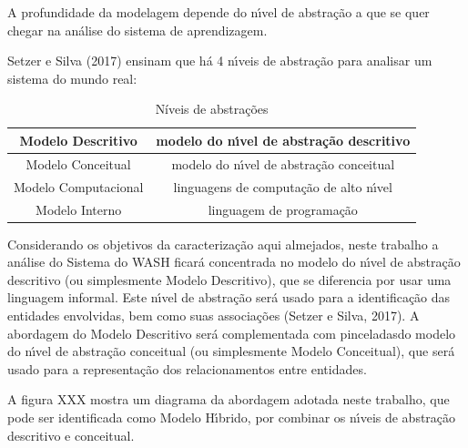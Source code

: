 \documentclass[
12pt,		%
openright,	%
twoside,  %
a4paper,			%
chapter=TITLE,		%
english,			%
french,				%
spanish,			%
brazil				%
]{USPSC-classe/USPSC}
\begin{document}
A profundidade da modelagem depende do n\'{\i}vel de abstra\c{c}\~ao a que se quer chegar na an\'alise do sistema de aprendizagem.










Setzer e Silva (2017) ensinam que h\'a 4 n\'{\i}veis de abstra\c{c}\~ao para analisar um sistema do mundo real:














\begin{table}[htb]
\tiny
\caption{\label{98b39a827ce08562e7aeba26851f8d86d1af7179}N\'{i}veis de abstra\c{c}\~oes}

\centering
\begin{tabular}{|c|c|}
\hline
Modelo Descritivo  &  modelo do n\'{\i}vel de abstra\c{c}\~ao descritivo \\
\hline
Modelo Conceitual  &  modelo do n\'{\i}vel de abstra\c{c}\~ao conceitual \\
\hline
Modelo Computacional  &  linguagens de computa\c{c}\~ao de alto n\'{\i}vel \\
\hline
Modelo Interno  &  linguagem de programa\c{c}\~ao \\
\hline
\end{tabular}
\end{table}


Considerando os objetivos da caracteriza\c{c}\~ao aqui almejados, neste trabalho a an\'alise do Sistema do WASH ficar\'a concentrada no modelo do n\'{\i}vel de abstra\c{c}\~ao descritivo (ou simplesmente Modelo Descritivo), que se diferencia por usar uma linguagem informal. Este n\'{\i}vel de abstra\c{c}\~ao ser\'a usado para a identifica\c{c}\~ao das entidades envolvidas, bem como suas associa\c{c}\~oes  (Setzer e Silva, 2017). A abordagem do Modelo Descritivo ser\'a complementada com \textquotedbl pinceladas\textquotedbl  do modelo do n\'{\i}vel de abstra\c{c}\~ao conceitual (ou simplesmente Modelo Conceitual), que ser\'a usado para a representa\c{c}\~ao dos relacionamentos entre entidades.










A figura XXX mostra um diagrama da abordagem adotada neste trabalho, que pode ser identificada como \textquotedbl Modelo H\'{\i}brido\textquotedbl , por combinar os n\'{\i}veis de abstra\c{c}\~ao descritivo e conceitual.
\end{document}
